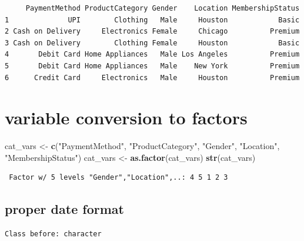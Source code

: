 \documentclass[
]{article}
\newenvironment{Shaded}{\begin{snugshade}}{\end{snugshade}}
\newcommand{\FunctionTok}[1]{\textcolor[rgb]{0.13,0.29,0.53}{\textbf{#1}}}
\newcommand{\NormalTok}[1]{#1}
\newcommand{\OtherTok}[1]{\textcolor[rgb]{0.56,0.35,0.01}{#1}}
\newcommand{\SpecialCharTok}[1]{\textcolor[rgb]{0.81,0.36,0.00}{\textbf{#1}}}
\newcommand{\StringTok}[1]{\textcolor[rgb]{0.31,0.60,0.02}{#1}}
\begin{document}
\begin{verbatim}
     PaymentMethod ProductCategory Gender    Location MembershipStatus
1              UPI        Clothing   Male     Houston            Basic
2 Cash on Delivery     Electronics Female     Chicago          Premium
3 Cash on Delivery        Clothing Female     Houston            Basic
4       Debit Card Home Appliances   Male Los Angeles          Premium
5       Debit Card Home Appliances   Male    New York          Premium
6      Credit Card     Electronics   Male     Houston          Premium
\end{verbatim}

\section{variable conversion to
factors}\label{variable-conversion-to-factors}

\begin{Shaded}
\begin{Highlighting}[]
\NormalTok{cat\_vars }\OtherTok{\textless{}{-}} \FunctionTok{c}\NormalTok{(}\StringTok{"PaymentMethod"}\NormalTok{, }\StringTok{"ProductCategory"}\NormalTok{, }\StringTok{"Gender"}\NormalTok{, }\StringTok{"Location"}\NormalTok{, }\StringTok{"MembershipStatus"}\NormalTok{)}
\NormalTok{cat\_vars }\OtherTok{\textless{}{-}} \FunctionTok{as.factor}\NormalTok{(cat\_vars)}
\FunctionTok{str}\NormalTok{(cat\_vars)}
\end{Highlighting}
\end{Shaded}

\begin{verbatim}
 Factor w/ 5 levels "Gender","Location",..: 4 5 1 2 3
\end{verbatim}

\subsection{proper date format}\label{proper-date-format}

\begin{Shaded}
\end{Shaded}

\begin{verbatim}
Class before: character 
\end{verbatim}
\end{document}
